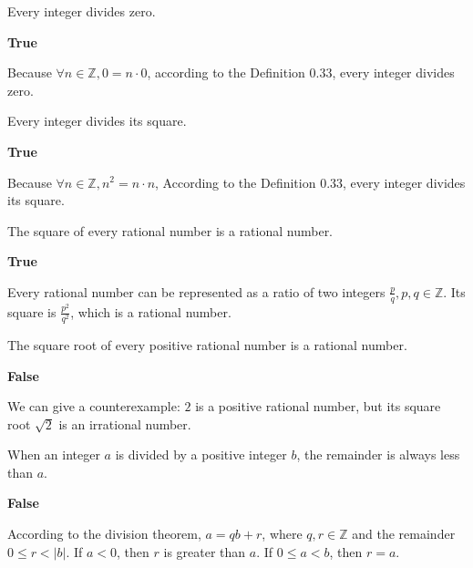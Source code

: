 \begin{chapex} %
Every integer divides zero.
\end{chapex}

\begin{mysolution}
    \textbf{True}

    Because $\forall n \in \mathbb{Z}, 0 = n \cdot 0$, according to the Definition 0.33, every integer divides zero.
\end{mysolution}

\begin{chapex} %
Every integer divides its square.
\end{chapex}

\begin{mysolution}
    \textbf{True}

    Because $\forall n \in \mathbb{Z}, n^2 = n \cdot n$, According to the Definition 0.33, every integer divides its square.
\end{mysolution}

\begin{chapex} %
The square of every rational number is a rational number.
\end{chapex}

\begin{mysolution}
    \textbf{True}

    Every rational number can be represented as a ratio of two integers $\frac{p}{q}, p,q \in \mathbb{Z}$. Its square is $\frac{p^2}{q^2}$, which is a rational number.
\end{mysolution}

\begin{chapex} %
The square root of every positive rational number is a rational number.
\end{chapex}

\begin{mysolution}
    \textbf{False}

    We can give a counterexample: $2$ is a positive rational number, but its square root $\sqrt{2}$ is an irrational number.
\end{mysolution}

\begin{chapex} %
When an integer $a$ is divided by a positive integer $b$, the remainder is always less than $a$.
\end{chapex}

\begin{mysolution}
    \textbf{False}

    According to the division theorem, $a = qb+r$, where $q, r \in \mathbb{Z}$ and the remainder $0 \le r < |b|$. If $a < 0$, then $r$ is greater than $a$. If $0 \le a < b$, then $r = a$.
\end{mysolution}

